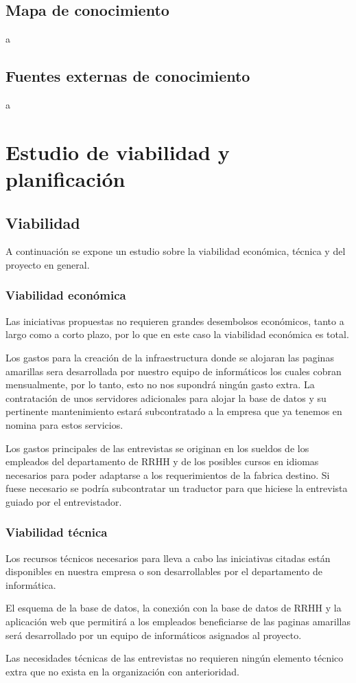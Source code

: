 \documentclass[a4paper]{article}
\begin{document}
\subsection{Mapa de conocimiento}

a

\subsection{Fuentes externas de conocimiento}

a


\section{Estudio de viabilidad y planificación}

\subsection{Viabilidad}

A continuación se expone un estudio sobre la viabilidad económica, técnica y del proyecto en general.

\subsubsection{Viabilidad económica}
Las iniciativas propuestas no requieren grandes desembolsos económicos, tanto a largo como a corto plazo, por lo que en este caso la viabilidad económica es total.\par
Los gastos para la creación de la infraestructura donde se alojaran las paginas amarillas sera desarrollada por nuestro equipo de informáticos los cuales cobran mensualmente, por lo tanto, esto no nos supondrá ningún gasto extra. La contratación de unos servidores adicionales para alojar la base de datos y su pertinente mantenimiento estará subcontratado a la empresa que ya tenemos en nomina para estos servicios.\par
Los gastos principales de las entrevistas se originan en los sueldos de los empleados del departamento de RRHH y de los posibles cursos en idiomas necesarios para poder adaptarse a los requerimientos de la fabrica destino. Si fuese necesario se podría subcontratar un traductor para que hiciese la entrevista guiado por el entrevistador.

\subsubsection{Viabilidad técnica}
Los recursos técnicos necesarios para lleva a cabo las iniciativas citadas están disponibles en nuestra empresa o son desarrollables por el departamento de informática.\par
El esquema de la base de datos, la conexión con la base de datos de RRHH y la aplicación web que permitirá a los empleados beneficiarse de las paginas amarillas será desarrollado por un equipo de informáticos asignados al proyecto. \par
Las necesidades técnicas de las entrevistas no requieren ningún elemento técnico extra que no exista en la organización con anterioridad.
\end{document}
